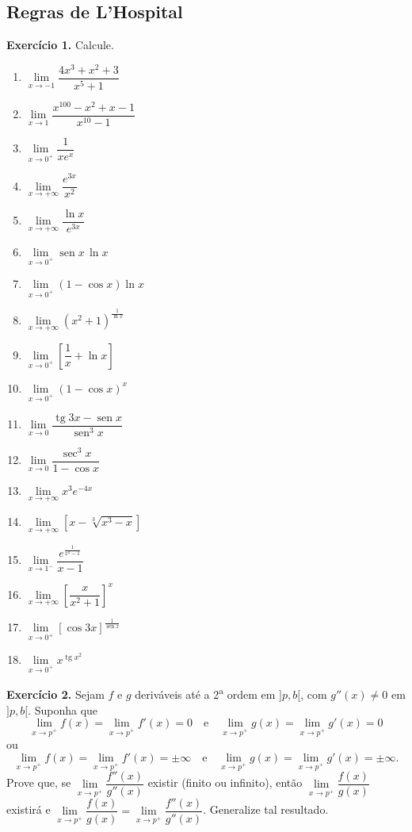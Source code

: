 \documentclass[12pt,a4paper]{article}
\begin{document}
\subsection{Regras de L'Hospital}
\vspace{0.5cm}
\noindent\textbf{Exercício 1.} Calcule.
\begin{enumerate}
    \renewcommand{\theenumi}{\alph{enumi}}
    \renewcommand{\labelenumi}{\theenumi)}
    \item $\lim\limits_{x \to -1} \dfrac{4x^3 + x^2 + 3}{x^5 + 1}$
    \item $\lim\limits_{x \to 1} \dfrac{x^{100} - x^2 + x - 1}{x^{10} - 1}$
    \item $\lim\limits_{x \to 0^+} \dfrac{1}{x e^x}$
    \item $\lim\limits_{x \to +\infty} \dfrac{e^{3x}}{x^2}$
    \item $\lim\limits_{x \to +\infty} \dfrac{\ln x}{e^{3x}}$
    \item $\lim\limits_{x \to 0^+} \operatorname{sen} x \, \ln x$
    \item $\lim\limits_{x \to 0^+} (1 - \cos x)\ln x$
    \item $\lim\limits_{x \to +\infty} (x^2 + 1)^{\frac{1}{\ln x}}$
    \item $\lim\limits_{x \to 0^+} \left[\dfrac{1}{x} + \ln x\right]$
    \item $\lim\limits_{x \to 0^+} (1 - \cos x)^x$
    \item $\lim\limits_{x \to 0} \dfrac{\operatorname{tg} 3x - \operatorname{sen} x}{\operatorname{sen}^3 x}$
    \item $\lim\limits_{x \to 0} \dfrac{\sec^3 x}{1 - \cos x}$
    \item $\lim\limits_{x \to +\infty} x^3 e^{-4x}$
    \item $\lim\limits_{x \to +\infty} [x - \sqrt[3]{x^3 - x}]$
    \item $\lim\limits_{x \to 1^-} \dfrac{e^{\frac{1}{x^2 - 1}}}{x - 1}$
    \item $\lim\limits_{x \to +\infty} \left[\dfrac{x}{x^2 + 1}\right]^x$
    \item $\lim\limits_{x \to 0^+} [\cos 3x]^{\frac{1}{\operatorname{sen} x}}$
    \item $\lim\limits_{x \to 0^+} x^{\operatorname{tg} x^2}$
\end{enumerate}

\vspace{0.5cm}
\noindent\textbf{Exercício 2.} Sejam $f$ e $g$ deriváveis até a 2\textsuperscript{a} ordem em $]p, b[$, com $g''(x) \neq 0$ em $]p, b[$. Suponha que
\[
\lim_{x \to p^+} f(x) = \lim_{x \to p^+} f'(x) = 0 \quad\text{e}\quad \lim_{x \to p^+} g(x) = \lim_{x \to p^+} g'(x) = 0
\]
ou
\[
\lim_{x \to p^+} f(x) = \lim_{x \to p^+} f'(x) = \pm\infty \quad\text{e}\quad \lim_{x \to p^+} g(x) = \lim_{x \to p^+} g'(x) = \pm\infty.
\]
Prove que, se $\lim\limits_{x \to p^+} \dfrac{f''(x)}{g''(x)}$ existir (finito ou infinito), então $\lim\limits_{x \to p^+} \dfrac{f(x)}{g(x)}$ existirá e $\lim\limits_{x \to p^+} \dfrac{f(x)}{g(x)} = \lim\limits_{x \to p^+} \dfrac{f''(x)}{g''(x)}$. Generalize tal resultado.
\end{document}
